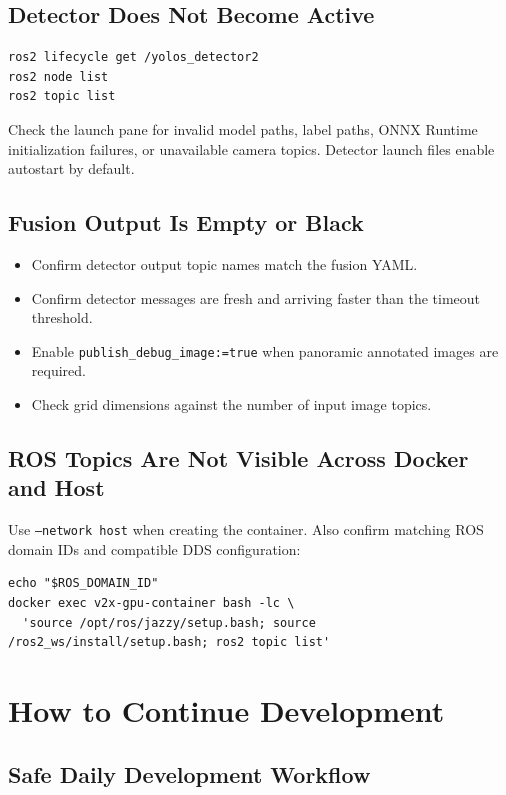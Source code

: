 \documentclass[11pt,a4paper]{article}
\begin{document}
\subsection{Detector Does Not Become Active}

\begin{lstlisting}
ros2 lifecycle get /yolos_detector2
ros2 node list
ros2 topic list
\end{lstlisting}

Check the launch pane for invalid model paths, label paths, ONNX Runtime initialization failures, or unavailable camera topics. Detector launch files enable autostart by default.

\subsection{Fusion Output Is Empty or Black}

\begin{itemize}
  \item Confirm detector output topic names match the fusion YAML.
  \item Confirm detector messages are fresh and arriving faster than the timeout threshold.
  \item Enable \texttt{publish\_debug\_image:=true} when panoramic annotated images are required.
  \item Check grid dimensions against the number of input image topics.
\end{itemize}

\subsection{ROS Topics Are Not Visible Across Docker and Host}

Use \texttt{--network host} when creating the container. Also confirm matching ROS domain IDs and compatible DDS configuration:

\begin{lstlisting}
echo "$ROS_DOMAIN_ID"
docker exec v2x-gpu-container bash -lc \
  'source /opt/ros/jazzy/setup.bash; source /ros2_ws/install/setup.bash; ros2 topic list'
\end{lstlisting}

\section{How to Continue Development}

\subsection{Safe Daily Development Workflow}
\end{document}
